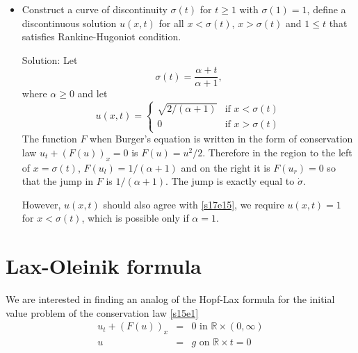 \documentclass{article}
\theoremstyle{plain}
\numberwithin{thm}{section}
\theoremstyle{plain}
\numberwithin{prop}{section}
\theoremstyle{definition}
\numberwithin{defn}{section}
\theoremstyle{remark}
\numberwithin{equation}{section}
\begin{document}
\begin{enumerate}
\begin{itemize}
\item Construct a curve of discontinuity $\sigma(t)$ for $t \ge 1$ with $\sigma(1) = 1$, define a
discontinuous solution $u(x, t)$ for all $x < \sigma(t)$, $x > \sigma(t)$ and $1 \le t$ that 
satisfies Rankine-Hugoniot condition.

\noindent Solution: Let 
\begin{equation}
\sigma(t) = \frac{\alpha + t}{\alpha + 1},
\end{equation}
where $\alpha \ge 0$ and let 
\begin{equation}
u(x, t) = \begin{cases}
\sqrt{2/(\alpha + 1)} & \text{if } x < \sigma(t) \\
0 & \text{if } x > \sigma(t)
\end{cases}
\end{equation}
The function $F$ when Burger's equation is written in the form of conservation law $u_t + (F(u))_x 
= 0$ is $F(u) = u^2/2$. Therefore in the region to the left of $x = \sigma(t)$, $F(u_l) = 
1/(\alpha + 1)$ and on the right it is $F(u_r) = 0$ so that the jump in $F$ is $1/(\alpha + 1)$. The 
jump is exactly equal to $\dot{\sigma}$.

However, $u(x, t)$ should also agree with \eqref{s17e15}, we require $u(x, t) = 1$ for $x < 
\sigma(t)$, which is possible only if $\alpha = 1$.
\end{itemize}
\end{enumerate}

\section{Lax-Oleinik formula}\label{s18}
We are interested in finding an analog of the Hopf-Lax formula for the initial value problem of
the conservation law \eqref{s15e1}
\begin{eqnarray*}
u_t + (F(u))_x &=& 0 \text{ in } \mathbb{R} \times (0, \infty) \\
u &=& g \text{ on } \mathbb{R} \times {t = 0}
\end{eqnarray*}
\end{document}
